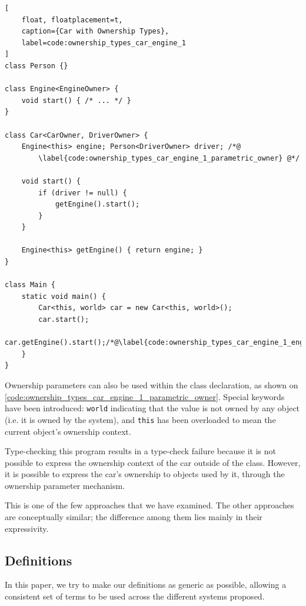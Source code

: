 \documentclass{acm_proc_article-sp}
\begin{document}
\begin{lstlisting}[
	float, floatplacement=t,
	caption={Car with Ownership Types},
	label=code:ownership_types_car_engine_1
]
class Person {}

class Engine<EngineOwner> {
	void start() { /* ... */ }
}

class Car<CarOwner, DriverOwner> {
	Engine<this> engine; Person<DriverOwner> driver; /*@
		\label{code:ownership_types_car_engine_1_parametric_owner} @*/

	void start() {
		if (driver != null) {
			getEngine().start();
		}
	}

	Engine<this> getEngine() { return engine; }
}

class Main {
	static void main() {
		Car<this, world> car = new Car<this, world>();
		car.start();
		car.getEngine().start();/*@\label{code:ownership_types_car_engine_1_engine_start}@*/
	}
}
\end{lstlisting}

Ownership parameters can also be used within the class declaration, as shown on
\cref{code:ownership_types_car_engine_1_parametric_owner}. Special keywords
have been introduced: \lstinline|world| indicating that the value is not owned
by any object (i.e. it is owned by the system), and \lstinline|this| has been
overloaded to mean the current object's ownership context.

Type-checking this program results in a type-check failure because it is not
possible to express the ownership context of the car outside of the class.
However, it is possible to express the car's ownership to objects used by it,
through the ownership parameter mechanism.

This is one of the few approaches that we have examined. The other approaches
are conceptually similar; the difference among them lies mainly in their
expressivity.

\subsection{Definitions}
\label{subsec:definitions}

In this paper, we try to make our definitions as generic as possible, allowing
a consistent set of terms to be used across the different systems proposed.
\end{document}
